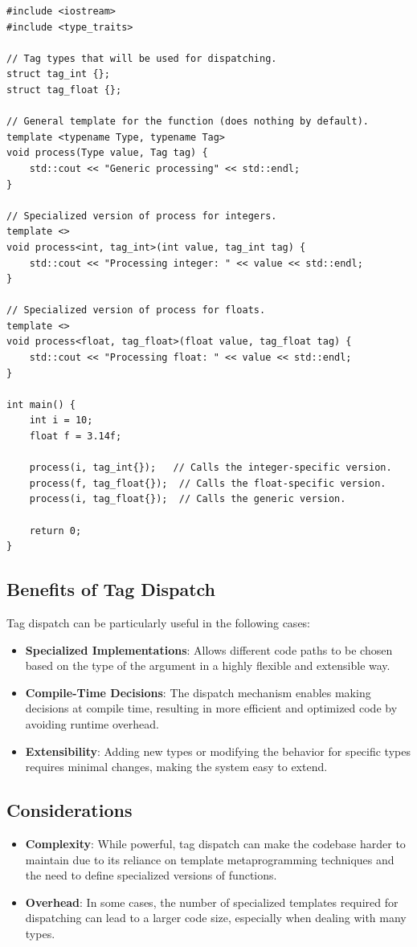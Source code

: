 \begin{lstlisting}
#include <iostream>
#include <type_traits>

// Tag types that will be used for dispatching.
struct tag_int {};
struct tag_float {};

// General template for the function (does nothing by default).
template <typename Type, typename Tag>
void process(Type value, Tag tag) {
    std::cout << "Generic processing" << std::endl;
}

// Specialized version of process for integers.
template <>
void process<int, tag_int>(int value, tag_int tag) {
    std::cout << "Processing integer: " << value << std::endl;
}

// Specialized version of process for floats.
template <>
void process<float, tag_float>(float value, tag_float tag) {
    std::cout << "Processing float: " << value << std::endl;
}

int main() {
    int i = 10;
    float f = 3.14f;

    process(i, tag_int{});   // Calls the integer-specific version.
    process(f, tag_float{});  // Calls the float-specific version.
    process(i, tag_float{});  // Calls the generic version.
    
    return 0;
}
\end{lstlisting}

\subsection{Benefits of Tag Dispatch}

Tag dispatch can be particularly useful in the following cases:
\begin{itemize}
    \item \textbf{Specialized Implementations}: Allows different code paths to be chosen based on the type of the argument in a highly flexible and extensible way.
    \item \textbf{Compile-Time Decisions}: The dispatch mechanism enables making decisions at compile time, resulting in more efficient and optimized code by avoiding runtime overhead.
    \item \textbf{Extensibility}: Adding new types or modifying the behavior for specific types requires minimal changes, making the system easy to extend.
\end{itemize}

\subsection{Considerations}
\begin{itemize}
    \item \textbf{Complexity}: While powerful, tag dispatch can make the codebase harder to maintain due to its reliance on template metaprogramming techniques and the need to define specialized versions of functions.
    \item \textbf{Overhead}: In some cases, the number of specialized templates required for dispatching can lead to a larger code size, especially when dealing with many types.
\end{itemize}





